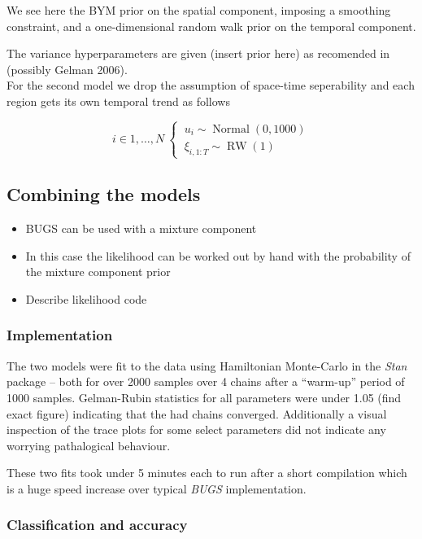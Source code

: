 \documentclass{article}
\begin{document}
We see here the BYM prior on the spatial component, imposing a smoothing constraint, and a one-dimensional random walk prior on the temporal component. 

The variance hyperparameters are given (insert prior here) as recomended in (possibly Gelman 2006). \\

For the second model we drop the assumption of space-time seperability and each region gets its own temporal trend as follows

\begin{equation}
i \in 1,\ldots,N \
\begin{cases}
\ u_i \sim \operatorname{Normal}(0, 1000) \\
\ \xi_{i, 1:T} \sim \operatorname{RW}(1) 
\end{cases}
\end{equation}

\subsection{Combining the models}

\begin{itemize}
\item BUGS can be used with a mixture component
\item In this case the likelihood can be worked out by hand with the probability of the mixture component prior
\item Describe likelihood code
\end{itemize}

\subsubsection{Implementation}

The two models were fit to the data using Hamiltonian Monte-Carlo in the \emph{Stan} package -- both for over 2000 samples over 4 chains after a ``warm-up'' period of 1000 samples. Gelman-Rubin statistics for all parameters were under 1.05 (find exact figure) indicating that the had chains converged. Additionally a visual inspection of the trace plots for some select parameters did not indicate any worrying pathalogical behaviour.

These two fits took under 5 minutes each to run after a short compilation which is a huge speed increase over typical \emph{BUGS} implementation.

\subsubsection{Classification and accuracy}
\end{document}
